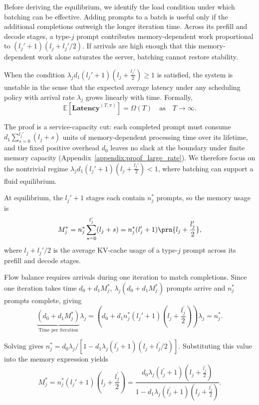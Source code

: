 Before deriving the equilibrium, we identify the load condition under which batching can be effective. Adding prompts to a batch is useful only if the additional completions outweigh the longer iteration time. Across its prefill and decode stages, a type-\(j\) prompt contributes memory-dependent work proportional to \((l_j' + 1)(l_j + l_j'/2)\). If arrivals are high enough that this memory-dependent work alone saturates the server, batching cannot restore stability.

\begin{proposition}\label{prop:large_rate}
When the condition $\lambda_j d_1 (l_j' + 1) \left( l_j + \frac{l_j'}{2} \right) \geq 1$ is satisfied, the system is unstable in the sense that the expected average latency under any scheduling policy with arrival rate \( \lambda_j \) grows linearly with time. Formally,
$$
\mathbb{E}[\textbf{Latency}^{(T,\pi)}] = \Omega(T) \quad \text{as} \quad T \to \infty.
$$
\end{proposition}

The proof is a service-capacity cut: each completed prompt must consume \(d_1\sum_{s=0}^{l_j'}(l_j+s)\) units of memory-dependent processing time over its lifetime, and the fixed positive overhead \(d_0\) leaves no slack at the boundary under finite memory capacity (Appendix~\ref{appendix:proof_large_rate}). We therefore focus on the nontrivial regime $\lambda_j d_1 (l_j' + 1) \left( l_j + \frac{l_j'}{2} \right) <1$, where batching can support a fluid equilibrium.

At equilibrium, the \(l_j'+1\) stages each contain \(n_j^*\) prompts, so the memory usage is
\begin{equation}
    M_j^* = n_j^* \sum_{s=0}^{l_j^{\prime}}(l_j+s) = n_j^*(l_j'+1)\prn{l_j+\frac{l_j'}{2}},
\end{equation}
where \(l_j+l_j'/2\) is the average KV-cache usage of a type-\(j\) prompt across its prefill and decode stages.

Flow balance requires arrivals during one iteration to match completions. Since one iteration takes time \(d_0+d_1M_j^*\), \(\lambda_j(d_0+d_1M_j^*)\) prompts arrive and \(n_j^*\) prompts complete, giving
\begin{equation}
\label{eq:single_type_equilibrium}
\underset{\text{Time per iteration}}{\underbrace{(d_0+d_1M_j^{*} )}}\lambda_j =\left(d_0+d_1 n_j^*(l_j'+1)\left( l_j +\frac{l_j^{\prime}}{2} \right) \right)\lambda_j= n_j^*.
\end{equation}

Solving gives \(n_j^* = d_0\lambda_j/[1-d_1\lambda_j(l_j^{\prime}+1)(l_j+l_j^{\prime}/2)]\). Substituting this value into the memory expression yields
\begin{equation}
    \label{eq:memory_single}
M_j^* = n_j^*(l_j'+1)\left( l_j+\frac{l_j^{\prime}}{2} \right)
=  \frac{d_0\lambda_j(l_j^{\prime}+1)\left( l_j+\frac{l_j^{\prime}}{2} \right) }{1-d_1\lambda_j(l_j^{\prime}+1)(l_j+\frac{l_j^{\prime}}{2})}.
\end{equation}

